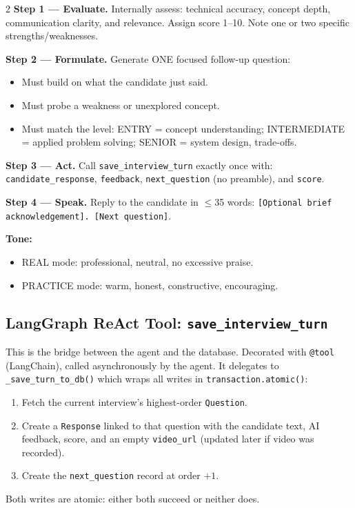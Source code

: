 \documentclass[10pt, a4paper]{article}
\begin{document}
\begin{multicols}{2}
\textbf{Step 1 --- Evaluate.} Internally assess: technical accuracy,
concept depth, communication clarity, and relevance. Assign score 1--10.
Note one or two specific strengths/weaknesses.

\textbf{Step 2 --- Formulate.} Generate ONE focused follow-up question:
\begin{itemize}
  \item Must build on what the candidate just said.
  \item Must probe a weakness or unexplored concept.
  \item Must match the level: ENTRY = concept understanding; INTERMEDIATE
        = applied problem solving; SENIOR = system design, trade-offs.
\end{itemize}

\textbf{Step 3 --- Act.} Call \texttt{save\_interview\_turn} exactly once
with: \texttt{candidate\_response}, \texttt{feedback}, \texttt{next\_question}
(no preamble), and \texttt{score}.

\textbf{Step 4 --- Speak.} Reply to the candidate in $\le$35 words:
\texttt{[Optional brief acknowledgement]. [Next question]}.

\textbf{Tone:}
\begin{itemize}
  \item REAL mode: professional, neutral, no excessive praise.
  \item PRACTICE mode: warm, honest, constructive, encouraging.
\end{itemize}

\subsection{LangGraph ReAct Tool: \texttt{save\_interview\_turn}}

This is the bridge between the agent and the database. Decorated with
\texttt{@tool} (LangChain), called asynchronously by the agent. It
delegates to \texttt{\_save\_turn\_to\_db()} which wraps all writes in
\texttt{transaction.atomic()}:
\begin{enumerate}
  \item Fetch the current interview's highest-order \texttt{Question}.
  \item Create a \texttt{Response} linked to that question with the
        candidate text, AI feedback, score, and an empty \texttt{video\_url}
        (updated later if video was recorded).
  \item Create the \texttt{next\_question} record at order $+1$.
\end{enumerate}
Both writes are atomic: either both succeed or neither does.


\end{multicols}
\end{document}
